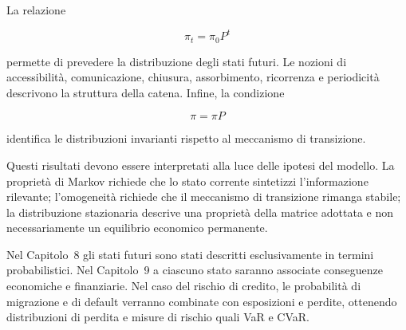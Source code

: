 La relazione

\[
\pi_t=\pi_0P^t
\]

permette di prevedere la distribuzione degli stati futuri. Le nozioni di
accessibilit\`{a}, comunicazione, chiusura, assorbimento, ricorrenza e
periodicit\`{a} descrivono la struttura della catena. Infine, la
condizione

\[
\pi=\pi P
\]

identifica le distribuzioni invarianti rispetto al meccanismo di
transizione.

Questi risultati devono essere interpretati alla luce delle ipotesi del
modello. La propriet\`{a} di Markov richiede che lo stato corrente
sintetizzi l'informazione rilevante; l'omogeneit\`{a} richiede che il
meccanismo di transizione rimanga stabile; la distribuzione stazionaria
descrive una propriet\`{a} della matrice adottata e non necessariamente
un equilibrio economico permanente.

Nel Capitolo~8 gli stati futuri sono stati descritti esclusivamente in
termini probabilistici. Nel Capitolo~9 a ciascuno stato saranno
associate conseguenze economiche e finanziarie. Nel caso del rischio di
credito, le probabilit\`{a} di migrazione e di default verranno
combinate con esposizioni e perdite, ottenendo distribuzioni di perdita
e misure di rischio quali VaR e CVaR.
